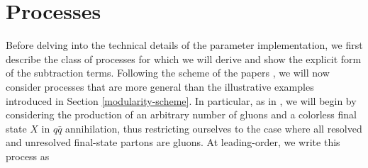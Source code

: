 \documentclass[a4paper, 12pt]{book}
\begin{document}
\section{Processes}
Before delving into the technical details of the parameter implementation, we first describe the class of processes for which we will derive and show the explicit form of the subtraction terms. Following the scheme of the papers \cite{Devoto:2023rpv,Devoto:2025kin}, we will now consider processes that are more general than the illustrative examples introduced in Section \ref{modularity-scheme}. In particular, as in \cite{Devoto:2023rpv}, we will begin by considering the production of an arbitrary number of gluons and a colorless final state $X$ in $q \bar{q}$ annihilation, thus restricting ourselves to the case where all resolved and unresolved final-state partons are gluons. At leading-order, we write this process as
\end{document}
